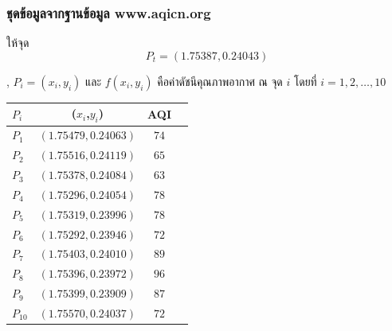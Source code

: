 \documentclass[12pt,aspectratio=169]{beamer}
\begin{document}
\begin{frame}
    \frametitle{ชุดข้อมูลจากฐานข้อมูล www.aqicn.org}
\begin{example}
    ให้จุด  \[P_t = (1.75387,0.24043)\]
    
    , $P_i=(x_i,y_i)$ และ $f(x_i,y_i)$ คือค่าดัชนีคุณภาพอากาศ ณ จุด $i$ โดยที่ $i=1,2,\ldots,10$
    \begin{center}
        \begin{tabular}{lccc} 
        \hline
       $P_i$ & ($x_i$,$y_i$) &  AQI \\
        \hline
        $P_1$ &$(1.75479,0.24063)$ &$74$\\
        $P_2$ &$(1.75516,0.24119)$ &$65$\\
        $P_3$ &$(1.75378,0.24084)$ &$63$\\
        $P_4$ &$(1.75296,0.24054)$ &$78$\\
        $P_5$ &$(1.75319,0.23996)$ &$78$\\
        $P_6$ &$(1.75292,0.23946)$ &$72$\\
        $P_7$ &$(1.75403,0.24010)$ &$89$\\
        $P_8$ &$(1.75396,0.23972)$ &$96$\\
        $P_9$ &$(1.75399,0.23909)$ &$87$\\
        $P_{10}$ &$(1.75570,0.24037)$ &$72$\\
        \hline
        \end{tabular}
    \end{center}
\end{example}
\end{frame}

    
\end{document}
